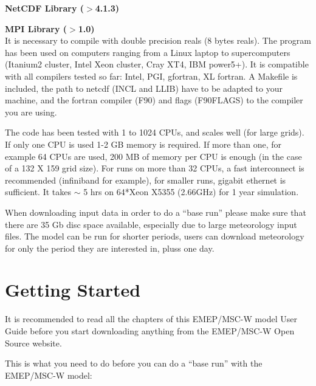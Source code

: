\textbf{NetCDF Library ($>$4.1.3)}

\textbf{MPI Library ($>$1.0)}\\

It is necessary to compile with double precision reals (8 bytes
reals). The program has been used on computers ranging from a Linux laptop to supercomputers 
(Itanium2 cluster, Intel Xeon cluster, Cray XT4, IBM power5+). It is compatible with all 
compilers tested so far:  Intel, PGI, gfortran, XL fortran. A Makefile is included,  
the path to netcdf (INCL and LLIB) have to be adapted to your machine, and the fortran 
compiler (F90) and flags (F90FLAGS) to the compiler you are using.



The code has been tested with 1 to 1024 CPUs, and scales well (for large grids).  If only one 
CPU is used 1-2 GB memory is required. If more than one,
for example 64 CPUs are used, 200 MB of memory per CPU is enough (in
the case of a 132 X 159 grid size). For runs on more than 32 CPUs, a fast interconnect is 
recommended (infiniband for example), for smaller runs, gigabit ethernet is sufficient. 
It takes $\sim$ 5 hrs on 64*Xeon X5355 (2.66GHz) for 1 year simulation.

When downloading input data in order to do a ``base run'' please make
sure that there are 35 Gb disc space available, especially due to
large meteorology input files. The model can be run for shorter periods, users 
can download meteorology for only the period they are interested in, pluss one day. 
 

\section{Getting Started}


It is recommended to read all the chapters of this EMEP/MSC-W model
User Guide before you start downloading anything from the EMEP/MSC-W Open
Source website.



This is what you need to do before you can do a ``base run'' with the 
EMEP/MSC-W model:

